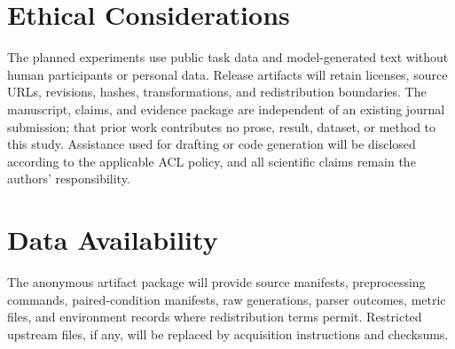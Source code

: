 \documentclass[11pt]{article}
\begin{document}
\section{Ethical Considerations}

The planned experiments use public task data and model-generated text without human participants or personal data. Release artifacts will retain licenses, source URLs, revisions, hashes, transformations, and redistribution boundaries. The manuscript, claims, and evidence package are independent of an existing journal submission; that prior work contributes no prose, result, dataset, or method to this study. Assistance used for drafting or code generation will be disclosed according to the applicable ACL policy, and all scientific claims remain the authors' responsibility.

\section*{Data Availability}

The anonymous artifact package will provide source manifests, preprocessing commands, paired-condition manifests, raw generations, parser outcomes, metric files, and environment records where redistribution terms permit. Restricted upstream files, if any, will be replaced by acquisition instructions and checksums.


\end{document}
